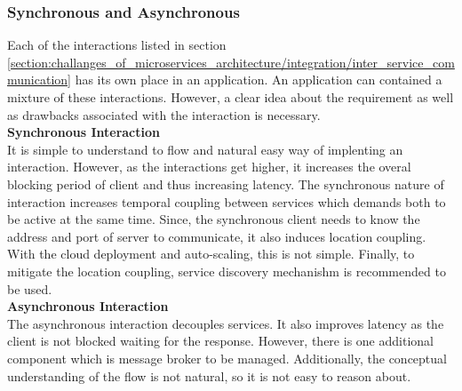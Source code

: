 \subsubsection{Synchronous and Asynchronous}\label{section:challanges_of_microservices_architecture/integration/synchronous_and_asynchronous}
Each of the interactions listed in section \ref{section:challanges_of_microservices_architecture/integration/inter_service_communication} has its own place in an application. An application can contained a mixture of these interactions. However, a clear idea about the requirement as well as drawbacks associated with the interaction is necessary.\cite{Newman:2015aa}\cite{Richardson:2014aa}\cite{Morris:2015aa}\\
\textbf{Synchronous Interaction}
\\
It is simple to understand to flow and natural easy way of implenting an interaction. However, as the interactions get higher, it increases the overal blocking period of client and thus increasing latency. The synchronous nature of interaction increases temporal coupling between services which demands both to be active at the same time. Since, the synchronous client needs to know the address and port of server to communicate, it also induces location coupling. With the cloud deployment and auto-scaling, this is not simple. Finally, to mitigate the location coupling, service discovery mechanishm is recommended to be used.
\\
  
\textbf{Asynchronous Interaction}
\\
The asynchronous interaction decouples services. It also improves latency as the client is not blocked waiting for the response. However, there is one additional component which is message broker to be managed. Additionally, the conceptual understanding of the flow is not natural, so it is not easy to reason about.

\\
